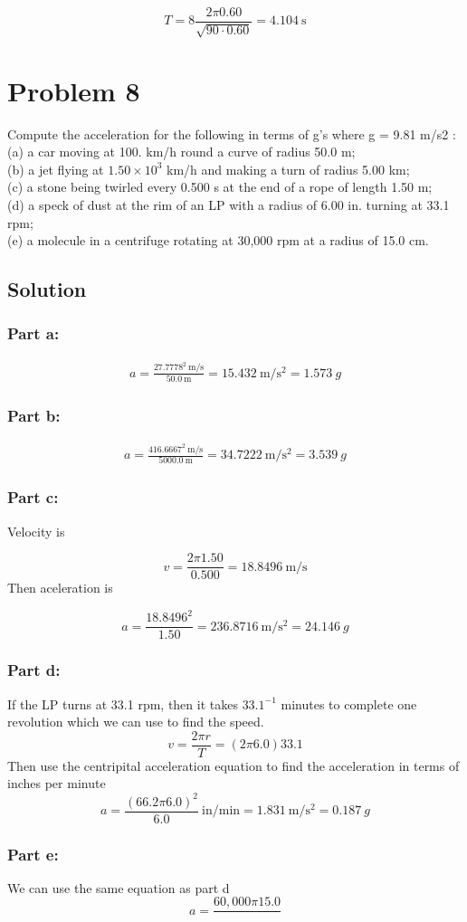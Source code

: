 \documentclass{article}
\begin{document}
\[
	T = 8 \frac{2 \pi 0.60}{\sqrt{90 \cdot 0.60}} = \boxed{4.104\ \text{s}}
\]


\section*{Problem 8}
Compute the acceleration for the following in terms of g's where g = 9.81 m/s2 :\\ (a) a car
moving at 100. km/h round a curve of radius 50.0 m;\\ (b) a jet flying at $1.50\times10^3$ km/h and
making a turn of radius 5.00 km;\\ (c) a stone being twirled every 0.500 s at the end of a rope of
length 1.50 m;\\ (d) a speck of dust at the rim of an LP with a radius of 6.00 in. turning at 33.1
rpm;\\ (e) a molecule in a centrifuge rotating at 30,000 rpm at a radius of 15.0 cm.

\subsection*{Solution}
\subsubsection*{Part a:}
\begin{align*}
	a = \frac{27.7778^2\ \text{m/s}}{50.0\ \text{m}} =  15.432\ \text{m}/\text{s}^2 = \boxed{1.573\ g}
\end{align*}

\subsubsection*{Part b:}
\begin{align*}
	a = \frac{416.6667^2\ \text{m/s}}{5000.0\ \text{m}} =  34.7222\ \text{m}/\text{s}^2 = \boxed{3.539\ g}
\end{align*}

\subsubsection*{Part c:}
Velocity is

\[
	v = \frac{2 \pi 1.50}{0.500} = 18.8496\ \text{m}/\text{s}
\]
Then aceleration is

\[
	a = \frac{18.8496^2}{1.50} = 236.8716\ \text{m}/\text{s}^2 = \boxed{24.146\ g}
\]

\subsubsection*{Part d:}
If the LP turns at 33.1 rpm, then it takes $33.1^{-1}$ minutes to complete one revolution which we can use to find the speed.
\[
	v = \frac{2 \pi r}{T} = \left(2 \pi 6.0 \right) 33.1
\]
Then use the centripital acceleration equation to find the acceleration in terms of inches per minute
\[
	a = \frac{\left( 66.2 \pi 6.0 \right)^2}{6.0}\ \text{in}/\text{min} = 1.831\ \text{m}/\text{s}^2 = 0.187\ g
\]

\subsubsection*{Part e:}
We can use the same equation as part d
\[
	a = \frac{60,000 \pi 15.0}{}
\]
\end{document}

